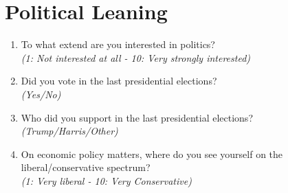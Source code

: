 \documentclass[11pt]{article}
\begin{document}
\section*{Political Leaning}
\begin{enumerate}[resume]
    \item To what extend are you interested in politics?\\ \textit{(1: Not interested at all - 10: Very strongly interested)}
    \item Did you vote in the last presidential elections? \\\textit{(Yes/No)}
    \item Who did you support in the last presidential elections? \\ \textit{(Trump/Harris/Other)}
    \item On economic policy matters, where do you see yourself on the liberal/conservative spectrum? \\\textit{(1: Very liberal - 10: Very Conservative)}
        

\end{enumerate}
\end{document}
